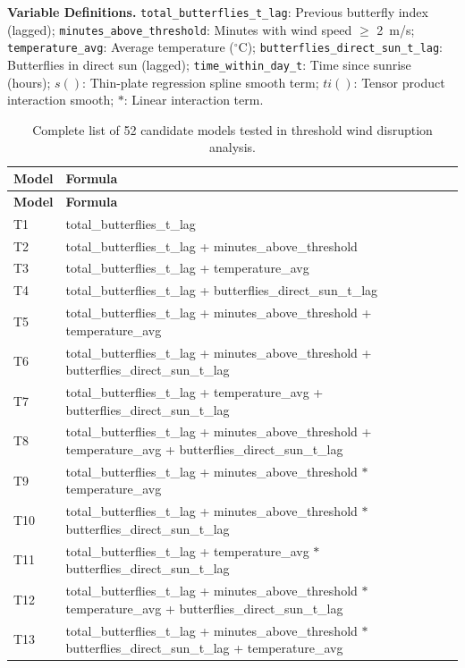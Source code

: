 \documentclass[insects,article,submit,pdftex,moreauthors]{Definitions/mdpi}
\begin{document}
\begin{appendix}
\textbf{Variable Definitions.}
\texttt{total\_butterflies\_t\_lag}: Previous butterfly index (lagged);
\texttt{minutes\_above\_threshold}: Minutes with wind speed $\geq$ 2~m/s;
\texttt{temperature\_avg}: Average temperature ($^{\circ}$C);
\texttt{butterflies\_direct\_sun\_t\_lag}: Butterflies in direct sun (lagged);
\texttt{time\_within\_day\_t}: Time since sunrise (hours);
$s()$: Thin-plate regression spline smooth term;
$ti()$: Tensor product interaction smooth;
$*$: Linear interaction term.

\begin{longtable}{ll}
\caption{Complete list of 52 candidate models tested in threshold wind disruption analysis.} \label{tab:threshold_candidates} \\
\toprule
\textbf{Model} & \textbf{Formula} \\
\midrule
\endfirsthead
\toprule
\textbf{Model} & \textbf{Formula} \\
\midrule
\endhead
T1  & total\_butterflies\_t\_lag \\
T2  & total\_butterflies\_t\_lag + minutes\_above\_threshold \\
T3  & total\_butterflies\_t\_lag + temperature\_avg \\
T4  & total\_butterflies\_t\_lag + butterflies\_direct\_sun\_t\_lag \\
T5  & total\_butterflies\_t\_lag + minutes\_above\_threshold + temperature\_avg \\
T6  & total\_butterflies\_t\_lag + minutes\_above\_threshold + butterflies\_direct\_sun\_t\_lag \\
T7  & total\_butterflies\_t\_lag + temperature\_avg + butterflies\_direct\_sun\_t\_lag \\
T8  & total\_butterflies\_t\_lag + minutes\_above\_threshold + temperature\_avg + butterflies\_direct\_sun\_t\_lag \\
T9  & total\_butterflies\_t\_lag + minutes\_above\_threshold $*$ temperature\_avg \\
T10 & total\_butterflies\_t\_lag + minutes\_above\_threshold $*$ butterflies\_direct\_sun\_t\_lag \\
T11 & total\_butterflies\_t\_lag + temperature\_avg $*$ butterflies\_direct\_sun\_t\_lag \\
T12 & total\_butterflies\_t\_lag + minutes\_above\_threshold $*$ temperature\_avg + butterflies\_direct\_sun\_t\_lag \\
T13 & total\_butterflies\_t\_lag + minutes\_above\_threshold $*$ butterflies\_direct\_sun\_t\_lag + temperature\_avg \\

\end{longtable}
\end{appendix}
\end{document}
